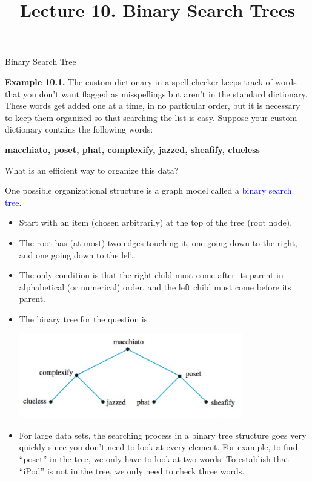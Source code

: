 \documentclass[aspectratio=169]{beamer}
\title{Lecture 10. Binary Search Trees}
\date{ }
\providecommand{\Blue}[1]{\textcolor{blue}{#1}}
\begin{document}
\frame[plain]{\titlepage}


\begin{frame}[plain]{Binary Search Tree}
 
  {\bf Example 10.1.} The custom dictionary in a spell-checker keeps track of words that 
     you don't want flagged as misspellings but aren't in the standard dictionary.
     These words get added one at a time, in no particular order, but it is necessary to keep them
     organized so that searching the list is easy.
     Suppose your custom dictionary contains the following words:
     
     \begin{center}
        {\small \bf macchiato, poset,  phat,  complexify,  jazzed,  sheafify, clueless}
     \end{center}

       What is an efficient way to organize this data? \pause 
       \medskip
       
    One possible organizational structure is a graph model called a \Blue{binary search tree}.
      \begin{itemize}
        \item Start with an item (chosen arbitrarily) at the top of the tree (root node).
        \item The root has (at most) two edges touching it, one going down to the right, and one going down to the left.
        \item The only condition is that the right child must come after its parent in alphabetical (or numerical) order,
        and the left child  must come before its parent.
      \end{itemize}

\end{frame}

\begin{frame}[plain]{ }
  \begin{itemize}[<+->]
   \item    The binary tree for the question is
   \medskip
   
    \begin{center}
         \includegraphics[height=3.7cm]{./img/lecture10-fig1.png}
       \end{center}
   \item For large data sets, the searching process in a binary tree structure
    goes very quickly since you don't need to look at
      every element. For example, to find ``poset'' in the tree, we only have to look at two words. To
       establish that ``iPod'' is not in the tree, we only need to check three words.
 \end{itemize}
\end{frame}
\end{document}
